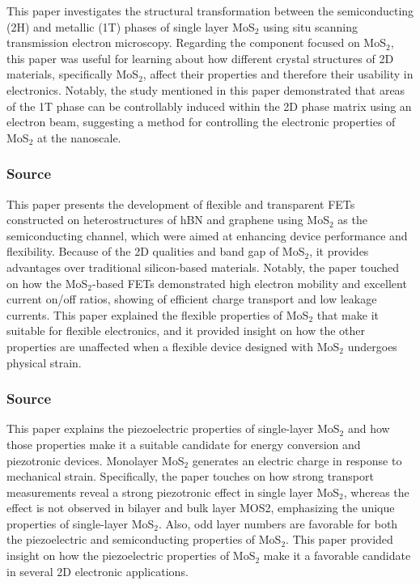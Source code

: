 \documentclass[conference]{IEEEtran}
\begin{document}
This paper investigates the structural transformation between the semiconducting (2H) and metallic (1T) phases of single layer MoS$_2$ using situ scanning transmission electron microscopy. Regarding the component focused on MoS$_2$, this paper was useful for learning about how different crystal structures of 2D materials, specifically MoS$_2$, affect their properties and therefore their usability in electronics. Notably, the study mentioned in this paper demonstrated that areas of the 1T phase can be controllably induced within the 2D phase matrix using an electron beam, suggesting a method for controlling the electronic properties of MoS$_2$ at the nanoscale.

\subsubsection{Source \cite{oa8}}

This paper presents the development of flexible and transparent FETs constructed on heterostructures of hBN and graphene using MoS$_2$ as the semiconducting channel, which were aimed at enhancing device performance and flexibility. Because of the 2D qualities and band gap of MoS$_2$, it provides advantages over traditional silicon-based materials. Notably, the paper touched on how the MoS$_2$-based FETs demonstrated high electron mobility and excellent current on/off ratios, showing of efficient charge transport and low leakage currents. This paper explained the flexible properties of MoS$_2$ that make it suitable for flexible electronics, and it provided insight on how the other properties are unaffected when a flexible device designed with MoS$_2$ undergoes physical strain.

\subsubsection{Source \cite{oa10}}

This paper explains the piezoelectric properties of single-layer MoS$_2$ and how those properties make it a suitable candidate for energy conversion and piezotronic devices. Monolayer MoS$_2$ generates an electric charge in response to mechanical strain. Specifically, the paper touches on how strong transport measurements reveal a strong piezotronic effect in single layer MoS$_2$, whereas the effect is not observed in bilayer and bulk layer MOS2, emphasizing the unique properties of single-layer MoS$_2$. Also, odd layer numbers are favorable for both the piezoelectric and semiconducting properties of MoS$_2$. This paper provided insight on how the piezoelectric properties of MoS$_2$ make it a favorable candidate in several 2D electronic applications.
\end{document}
